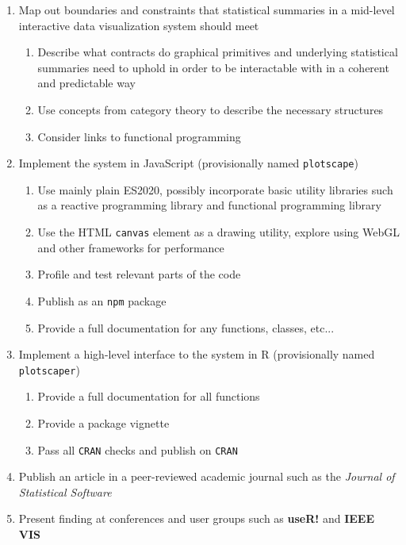 \documentclass[12pt,a4paper]{article}
\begin{document}
\begin{enumerate}

\item
Map out boundaries and constraints that statistical summaries in a mid-level interactive data visualization system should meet
  \begin{enumerate}
  \item Describe what contracts do graphical primitives and underlying statistical summaries need to uphold in order to be interactable with in a coherent and predictable way
  \item Use concepts from category theory to describe the necessary structures
  \item Consider links to functional programming  
  \end{enumerate}

\item Implement the system in JavaScript (provisionally named \texttt{plotscape})
  \begin{enumerate}
  \item Use mainly plain ES2020, possibly incorporate basic utility libraries such as a reactive programming library and functional programming library
  \item Use the HTML \texttt{canvas} element as a drawing utility, explore using WebGL and other frameworks for performance
  \item Profile and test relevant parts of the code
  \item Publish as an \texttt{npm} package
  \item Provide a full documentation for any functions, classes, etc...
  \end{enumerate}

\item Implement a high-level interface to the system in R (provisionally named \texttt{plotscaper})
  \begin{enumerate}
  \item Provide a full documentation for all functions
  \item Provide a package vignette
  \item Pass all \texttt{CRAN} checks and publish on \texttt{CRAN} 
  \end{enumerate}
  
\item Publish an article in a peer-reviewed academic journal such as the \textit{Journal of Statistical Software}

\item Present finding at conferences and user groups such as \textbf{useR!} and \textbf{IEEE VIS}

\end{enumerate}
\end{document}
